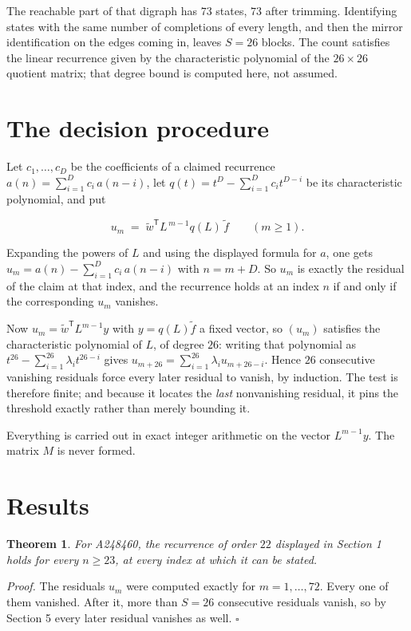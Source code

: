 \documentclass[11pt]{article}
\newtheorem{theorem}{Theorem}
\theoremstyle{definition}
\begin{document}
The reachable part of that digraph has $73$ states, $73$ after trimming. Identifying states with the same number of completions of every length, and then the mirror identification on the edges coming in, leaves $S = 26$ blocks. The count satisfies the linear recurrence given by the characteristic polynomial of the $26\times26$ quotient matrix; that degree bound is computed here, not assumed.

\section{The decision procedure}

Let $c_1,\dots,c_D$ be the coefficients of a claimed recurrence $a(n) = \sum_{i=1}^{D} c_i\,a(n-i)$, let $q(t) = t^{D} - \sum_{i=1}^{D} c_i t^{D-i}$ be its characteristic polynomial, and put

\[u_m \;=\; \tilde w^{\mathsf T} L^{\,m-1} q(L)\,\tilde f \qquad (m \ge 1).\]

Expanding the powers of $L$ and using the displayed formula for $a$, one gets $u_m = a(n) - \sum_{i=1}^{D} c_i\,a(n-i)$ with $n = m + D$. So $u_m$ is exactly the residual of the claim at that index, and the recurrence holds at an index $n$ if and only if the corresponding $u_m$ vanishes.

Now $u_m = \tilde w^{\mathsf T} L^{m-1} y$ with $y = q(L)\tilde f$ a fixed vector, so $(u_m)$ satisfies the characteristic polynomial of $L$, of degree $26$: writing that polynomial as $t^{26} - \sum_{i=1}^{26} \lambda_i t^{26-i}$ gives $u_{m+26} = \sum_{i=1}^{26} \lambda_i u_{m+26-i}$. Hence $26$ consecutive vanishing residuals force every later residual to vanish, by induction. The test is therefore finite; and because it locates the {\itshape last} nonvanishing residual, it pins the threshold exactly rather than merely bounding it.

Everything is carried out in exact integer arithmetic on the vector $L^{m-1}y$. The matrix $M$ is never formed.

\section{Results}

\begin{theorem} For A248460, the recurrence of order $22$ displayed in Section 1 holds for every $n \ge 23$, at every index at which it can be stated.\end{theorem}

{\itshape Proof.} The residuals $u_m$ were computed exactly for $m = 1,\dots,72$. Every one of them vanished. After it, more than $S = 26$ consecutive residuals vanish, so by Section 5 every later residual vanishes as well. $\square$
\end{document}
